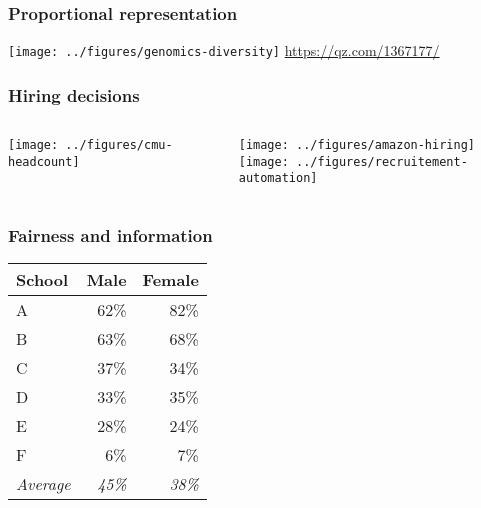 \documentclass{beamer}
\begin{document}
\begin{frame}
  \frametitle{Proportional representation}
  \texttt{[image: ../figures/genomics-diversity]}
  \url{https://qz.com/1367177/}
\end{frame}



\begin{frame}
  \frametitle{Hiring decisions}
  \begin{columns}
    \begin{column}{0.5\textwidth}
      \texttt{[image: ../figures/cmu-headcount]}
    \end{column}
    \begin{column}{0.5\textwidth}
      \texttt{[image: ../figures/amazon-hiring]}
      \\
      \texttt{[image: ../figures/recruitement-automation]}
    \end{column}
  \end{columns}
\end{frame}

\begin{frame}
  \frametitle{Fairness and information}
  \begin{example}
    \begin{table}[H]
      \begin{tabular}{l|r|r}
        School & Male  & Female\\
        \hline
        A & 62\% & 82\%\\
        B & 63\% & 68\%\\
        C & 37\% & 34\%\\
        D & 33\% & 35\%\\
        E & 28\% & 24\%\\
        F &  6\% &  7\%\\
        \hline
        \emph{Average} & \emph{45\%} & \emph{38\%}
      \end{tabular}
    \end{table}
  \end{example}
\end{frame}


\end{document}
